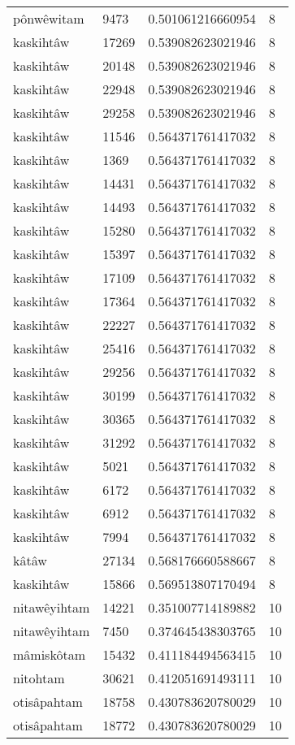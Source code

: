 \begin{longtable}{llll}
pônwêwitam & 9473 & 0.501061216660954 & 8 \\
kaskihtâw & 17269 & 0.539082623021946 & 8 \\
kaskihtâw & 20148 & 0.539082623021946 & 8 \\
kaskihtâw & 22948 & 0.539082623021946 & 8 \\
kaskihtâw & 29258 & 0.539082623021946 & 8 \\
kaskihtâw & 11546 & 0.564371761417032 & 8 \\
kaskihtâw & 1369 & 0.564371761417032 & 8 \\
kaskihtâw & 14431 & 0.564371761417032 & 8 \\
kaskihtâw & 14493 & 0.564371761417032 & 8 \\
kaskihtâw & 15280 & 0.564371761417032 & 8 \\
kaskihtâw & 15397 & 0.564371761417032 & 8 \\
kaskihtâw & 17109 & 0.564371761417032 & 8 \\
kaskihtâw & 17364 & 0.564371761417032 & 8 \\
kaskihtâw & 22227 & 0.564371761417032 & 8 \\
kaskihtâw & 25416 & 0.564371761417032 & 8 \\
kaskihtâw & 29256 & 0.564371761417032 & 8 \\
kaskihtâw & 30199 & 0.564371761417032 & 8 \\
kaskihtâw & 30365 & 0.564371761417032 & 8 \\
kaskihtâw & 31292 & 0.564371761417032 & 8 \\
kaskihtâw & 5021 & 0.564371761417032 & 8 \\
kaskihtâw & 6172 & 0.564371761417032 & 8 \\
kaskihtâw & 6912 & 0.564371761417032 & 8 \\
kaskihtâw & 7994 & 0.564371761417032 & 8 \\
kâtâw & 27134 & 0.568176660588667 & 8 \\
kaskihtâw & 15866 & 0.569513807170494 & 8 \\
nitawêyihtam & 14221 & 0.351007714189882 & 10 \\
nitawêyihtam & 7450 & 0.374645438303765 & 10 \\
mâmiskôtam & 15432 & 0.411184494563415 & 10 \\
nitohtam & 30621 & 0.412051691493111 & 10 \\
otisâpahtam & 18758 & 0.430783620780029 & 10 \\
otisâpahtam & 18772 & 0.430783620780029 & 10 \\

\end{longtable}
